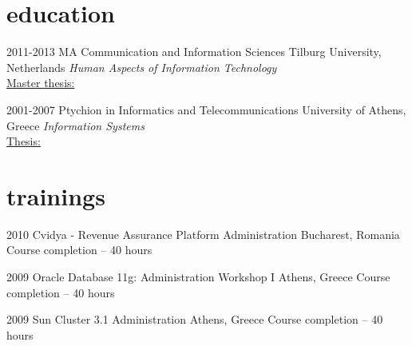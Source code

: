 \documentclass[]{friggeri-cv} %
\begin{document}
\section{education}

\begin{entrylist}


\entry
{2011-2013}
{MA Communication and Information Sciences}
{Tilburg University, Netherlands}
{\emph{Human Aspects of Information Technology} \\ 
\underline{Master thesis:}
}


\entry
{2001-2007}
{Ptychion in Informatics and Telecommunications}
{University of Athens, Greece}
{\emph{Information Systems} \\
\underline{Thesis:}
}


\end{entrylist}

\pagebreak
\section{trainings}

\begin{entrylist}


\entry
{2010}
{Cvidya - Revenue Assurance Platform Administration}
{Bucharest, Romania}
{Course completion -- 40 hours}

\entry
{2009}
{Oracle Database 11g: Administration Workshop I}
{Athens, Greece}
{Course completion -- 40 hours}

\entry
{2009}
{Sun Cluster 3.1 Administration}
{Athens, Greece}
{Course completion -- 40 hours}

\end{entrylist}

\end{document}
